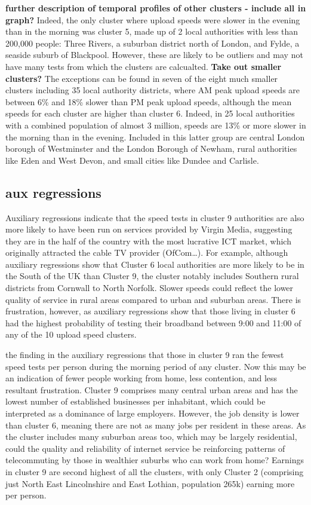 \documentclass[]{interact}
\theoremstyle{plain}%
\theoremstyle{definition}
\theoremstyle{remark}
\begin{document}
\textbf{further description of temporal profiles of other clusters -
include all in graph?} Indeed, the only cluster where upload speeds were
slower in the evening than in the morning was cluster 5, made up of 2
local authorities with less than 200,000 people: Three Rivers, a
suburban district north of London, and Fylde, a seaside suburb of
Blackpool. However, these are likely to be outliers and may not have
many tests from which the clusters are calcualted. \textbf{Take out
smaller clusters?} The exceptions can be found in seven of the eight
much smaller clusters including 35 local authority districts, where AM
peak upload speeds are between 6\% and 18\% slower than PM peak upload
speeds, although the mean speeds for each cluster are higher than
cluster 6. Indeed, in 25 local authorities with a combined population of
almost 3 million, speeds are 13\% or more slower in the morning than in
the evening. Included in this latter group are central London borough of
Westminster and the London Borough of Newham, rural authorities like
Eden and West Devon, and small cities like Dundee and Carlisle.

\hypertarget{aux-regressions}{%
\subsection{aux regressions}\label{aux-regressions}}

Auxiliary regressions indicate that the speed tests in cluster 9
authorities are also more likely to have been run on services provided
by Virgin Media, suggesting they are in the half of the country with the
most lucrative ICT market, which originally attracted the cable TV
provider (OfCom\ldots). For example, although auxiliary regressions show
that Cluster 6 local authorities are more likely to be in the South of
the UK than Cluster 9, the cluster notably includes Southern rural
districts from Cornwall to North Norfolk. Slower speeds could reflect
the lower quality of service in rural areas compared to urban and
suburban areas. There is frustration, however, as auxiliary regressions
show that those living in cluster 6 had the highest probability of
testing their broadband between 9:00 and 11:00 of any of the 10 upload
speed clusters.

the finding in the auxiliary regressions that those in cluster 9 ran the
fewest speed tests per person during the morning period of any cluster.
Now this may be an indication of fewer people working from home, less
contention, and less resultant frustration. Cluster 9 comprises many
central urban areas and has the lowest number of established businesses
per inhabitant, which could be interpreted as a dominance of large
employers. However, the job density is lower than cluster 6, meaning
there are not as many jobs per resident in these areas. As the cluster
includes many suburban areas too, which may be largely residential,
could the quality and reliability of internet service be reinforcing
patterns of telecommuting by those in wealthier suburbs who can work
from home? Earnings in cluster 9 are second highest of all the clusters,
with only Cluster 2 (comprising just North East Lincolnshire and East
Lothian, population 265k) earning more per person.
\end{document}
